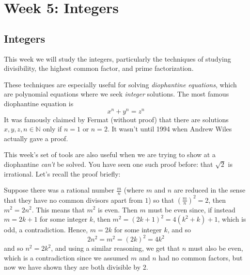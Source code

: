 \documentclass[11pt,dvipsnames]{book}
\numberwithin{figure}{section} %
\numberwithin{table}{section} %
\begin{document}
%
%



\part{Week 5: Integers}

\chapter{Integers}



This week we will study the integers, particularly the techniques of studying divisibility, the highest common factor, and prime factorization.

These techniques are especially useful for solving {\it diophantine equations}, which are polynomial equations where we seek {\it integer} solutions. The most famous diophantine equation is
\[
x^{n}+y^{n}=z^{n}\]
It was famously claimed by Fermat (without proof) that there are solutions  $x,y,z,n\in\mathbb{N}$ only if $n=1$ or $n=2$. It wasn't until 1994 when Andrew Wiles actually gave a proof.

This week's set of tools are also useful when we are trying to show at a diophantine {\it can't} be solved. You have seen one such proof before: that $\sqrt{2}$ is irrational. Let's recall the proof briefly:

Suppose there was a rational number $\frac{m}{n}$ (where $m$ and $n$ are reduced in the sense that they have no common divisors apart from $1$) so that $\left(\frac{m}{n}\right)^2=2$, then $m^2=2n^2$. This means that $m^2$ is even. Then $m$ must be even since, if instead $m=2k+1$ for some integer $k$, then $m^2=(2k+1)^2=4(k^2+k)+1$, which is odd, a contradiction. Hence, $m=2k$ for some integer $k$, and so
\[
2n^2=m^2=(2k)^2=4k^2\]
and so $n^2=2k^2$, and using a similar reasoning, we get that $n$ must also be even, which is a contradiction since we assumed $m$ and $n$ had no common factors, but now we have shown they are both divisible by $2$.
\end{document}
